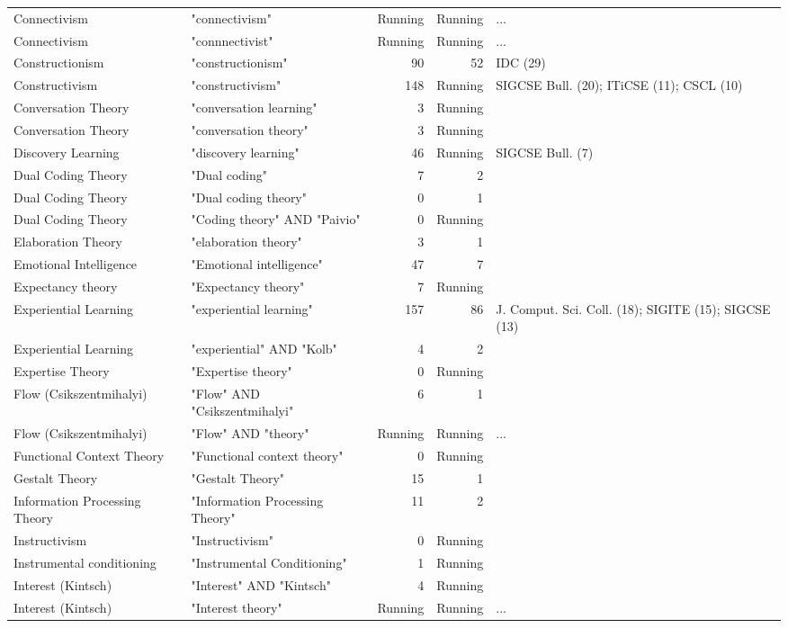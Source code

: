 \begin{table*}[t]
\begin{tabular}{p{4cm}p{6cm}rrp{3cm}}
Connectivism & "connectivism" & Running & Running & ... \\
Connectivism & "connnectivist" & Running & Running & ... \\
Constructionism & "constructionism" & 90 & 52 & IDC  (29) \\
Constructivism & "constructivism" & 148 & Running & SIGCSE Bull. (20); ITiCSE  (11); CSCL  (10) \\
Conversation Theory & "conversation learning" & 3 & Running &  \\
Conversation Theory & "conversation theory" & 3 & Running &  \\
Discovery Learning & "discovery learning" & 46 & Running & SIGCSE Bull. (7) \\
Dual Coding Theory & "Dual coding" & 7 & 2 &  \\
Dual Coding Theory & "Dual coding theory" & 0 & 1 &  \\
Dual Coding Theory & "Coding theory" AND "Paivio" & 0 & Running &  \\
Elaboration Theory & "elaboration theory" & 3 & 1 &  \\
Emotional Intelligence & "Emotional intelligence" & 47 & 7 &  \\
Expectancy theory & "Expectancy theory" & 7 & Running &  \\
Experiential Learning & "experiential learning" & 157 & 86 & J. Comput. Sci. Coll. (18); SIGITE  (15); SIGCSE  (13) \\
Experiential Learning & "experiential" AND "Kolb" & 4 & 2 &  \\
Expertise Theory & "Expertise theory" & 0 & Running &  \\
Flow (Csikszentmihalyi) & "Flow" AND "Csikszentmihalyi" & 6 & 1 &  \\
Flow (Csikszentmihalyi) & "Flow" AND "theory" & Running & Running & ... \\
Functional Context Theory & "Functional context theory" & 0 & Running &  \\
Gestalt Theory & "Gestalt Theory" & 15 & 1 &  \\
Information Processing Theory & "Information Processing Theory" & 11 & 2 &  \\
Instructivism & "Instructivism" & 0 & Running &  \\
Instrumental conditioning & "Instrumental Conditioning" & 1 & Running &  \\
Interest (Kintsch) & "Interest" AND "Kintsch" & 4 & Running &  \\
Interest (Kintsch) & "Interest theory" & Running & Running & ... \\

\end{tabular}
\end{table*}
